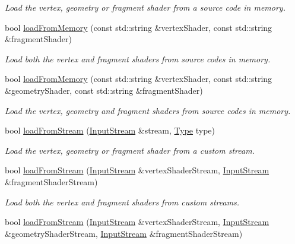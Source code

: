 \begin{DoxyCompactItemize}
\begin{DoxyCompactList}\small\item\em Load the vertex, geometry or fragment shader from a source code in memory. \end{DoxyCompactList}\item 
bool \hyperlink{classsf_1_1_shader_ae34e94070d7547a890166b7993658a9b}{load\+From\+Memory} (const std\+::string \&vertex\+Shader, const std\+::string \&fragment\+Shader)
\begin{DoxyCompactList}\small\item\em Load both the vertex and fragment shaders from source codes in memory. \end{DoxyCompactList}\item 
bool \hyperlink{classsf_1_1_shader_ab8c8b715b02aba2cf7c0a0e0c0984250}{load\+From\+Memory} (const std\+::string \&vertex\+Shader, const std\+::string \&geometry\+Shader, const std\+::string \&fragment\+Shader)
\begin{DoxyCompactList}\small\item\em Load the vertex, geometry and fragment shaders from source codes in memory. \end{DoxyCompactList}\item 
bool \hyperlink{classsf_1_1_shader_a2ee1b130c0606e4f8bcdf65c1efc2a53}{load\+From\+Stream} (\hyperlink{classsf_1_1_input_stream}{Input\+Stream} \&stream, \hyperlink{classsf_1_1_shader_afaa1aa65e5de37b74d047da9def9f9b3}{Type} type)
\begin{DoxyCompactList}\small\item\em Load the vertex, geometry or fragment shader from a custom stream. \end{DoxyCompactList}\item 
bool \hyperlink{classsf_1_1_shader_a3b7958159ffb5596c4babc3052e35465}{load\+From\+Stream} (\hyperlink{classsf_1_1_input_stream}{Input\+Stream} \&vertex\+Shader\+Stream, \hyperlink{classsf_1_1_input_stream}{Input\+Stream} \&fragment\+Shader\+Stream)
\begin{DoxyCompactList}\small\item\em Load both the vertex and fragment shaders from custom streams. \end{DoxyCompactList}\item 
bool \hyperlink{classsf_1_1_shader_aa08f1c091806205e6654db9d83197fcd}{load\+From\+Stream} (\hyperlink{classsf_1_1_input_stream}{Input\+Stream} \&vertex\+Shader\+Stream, \hyperlink{classsf_1_1_input_stream}{Input\+Stream} \&geometry\+Shader\+Stream, \hyperlink{classsf_1_1_input_stream}{Input\+Stream} \&fragment\+Shader\+Stream)

\end{DoxyCompactItemize}
